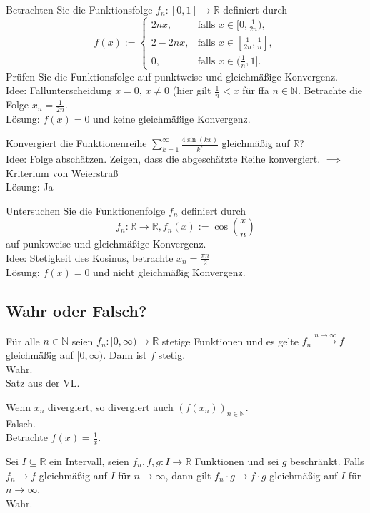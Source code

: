 Betrachten Sie die Funktionsfolge $f_n:[0,1] \to \mathbb{R}$ definiert durch
\begin{displaymath}
  f(x) := 
  \begin{cases}
    2nx,& \text{falls } x \in [0,\frac{1}{2n}),\\
    2 - 2nx,& \text{falls } x \in [\frac{1}{2n}, \frac{1}{n}],\\
    0,& \text{falls } x \in (\frac{1}{n}, 1].
  \end{cases}
\end{displaymath}
Prüfen Sie die Funktionsfolge auf punktweise und gleichmäßige Konvergenz.\\
Idee: Fallunterscheidung $x = 0$, $x \neq 0$ (hier gilt $\frac{1}{n} < x$ für ffa $n \in \mathbb{N}$.
Betrachte die Folge $x_n = \frac{1}{2n}$.\\
Lösung: $f(x) = 0$ und keine gleichmäßige Konvergenz.

Konvergiert die Funktionenreihe $\sum_{k = 1}^{\infty} \frac{4 \sin(kx)}{k^2}$ gleichmäßig auf $\mathbb{R}$?\\
Idee: Folge abschätzen. Zeigen, dass die abgeschätzte Reihe konvergiert. $\implies$ Kriterium von Weierstraß\\
Lösung: Ja

Untersuchen Sie die Funktionenfolge $f_n$ definiert durch
\begin{displaymath}
  f_n : \mathbb{R} \to \mathbb{R}, f_n(x) := \cos\left(\frac{x}{n}\right)
\end{displaymath}
auf punktweise und gleichmäßige Konvergenz.\\
Idee: Stetigkeit des Kosinus, betrachte $x_n = \frac{\pi n}{2}$\\
Lösung: $f(x) = 0$ und nicht gleichmäßig Konvergenz.

\subsection{Wahr oder Falsch?}
Für alle $n \in \mathbb{N}$ seien $f_n : [0, \infty) \to \mathbb{R}$ stetige Funktionen und es gelte $f_n \xrightarrow{n \to \infty} f$ gleichmäßig auf $[0,\infty)$. Dann ist $f$ stetig.\\
Wahr.\\
Satz aus der VL.

Wenn $x_n$ divergiert, so divergiert auch $(f(x_n))_{n \in \mathbb{N}}$.\\
Falsch.\\
Betrachte $f(x) = \frac{1}{x}$.

Sei $I \subseteq \mathbb{R}$ ein Intervall, seien $f_n, f, g : I \to \mathbb{R}$ Funktionen und sei $g$ beschränkt.
Falls $f_n \to f$ gleichmäßig auf $I$ für $n \to \infty$, dann gilt $f_n \cdot g \to f \cdot g$ gleichmäßig auf $I$ für $n \to \infty$.\\
Wahr.